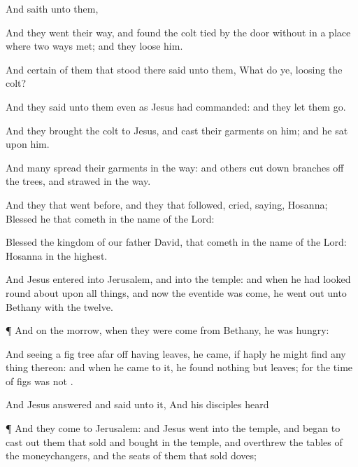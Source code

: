{And
saith unto
them,
{}


And they went their
way,
and
found the
colt
tied
by the
door
without
in a place where two ways
met;
and they
loose
him.

And
certain of them
that
stood
there
said unto
them,
What do
ye,
loosing the
colt?

And they
said unto
them even
as
Jesus had
commanded:
and they
let
them
go.

And they
brought the
colt
to
Jesus,
and
cast
their
garments on
him;
and he
sat
upon
him.

And
many
spread
their
garments
in the
way:
and
others cut
down
branches
off the
trees,
and
strawed
{}
in the
way.

And they
that went
before,
and they
that
followed,
cried,
saying,
Hosanna;
Blessed
{} he
that
cometh
in the
name of the
Lord:

Blessed
{} the
kingdom of
our
father
David,
that
cometh
in the
name of the
Lord:
Hosanna
in the
highest.

And
Jesus
entered
into
Jerusalem,
and
into the
temple: and
when he had looked round about
upon all
things, and
now the
eventide was
come, he went
out
unto
Bethany
with the
twelve.


\par }{\PP {}¶
And on the
morrow, when
they were
come
from
Bethany, he was
hungry:

And
seeing a fig
tree afar
off
having
leaves, he
came,
if
haply he might
find any
thing
thereon: and
when he
came
to
it, he
found
nothing
but
leaves;
for the
time of
figs
was
not
{}.

And
Jesus
answered and
said unto
it,
{}
And
his
disciples
heard
{}


\par }{\PP {}¶
And they
come
to
Jerusalem:
and
Jesus
went
into the
temple, and
began to cast
out them
that
sold
and
bought
in the
temple,
and
overthrew the
tables of the
moneychangers,
and the
seats of them
that
sold
doves;

}
